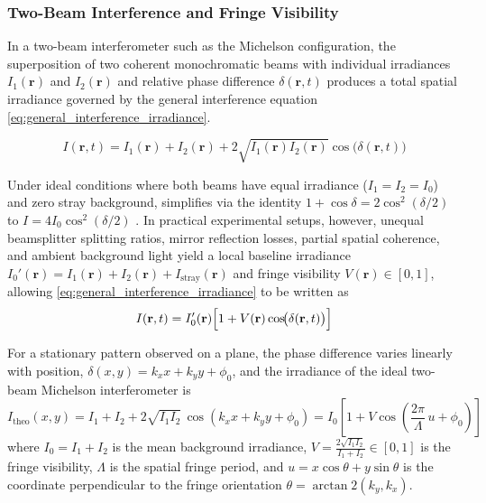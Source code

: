 \subsubsection{Two-Beam Interference and Fringe Visibility}
\label{sec:two_beam_interference}

In a two-beam interferometer such as the Michelson configuration, the superposition of two coherent monochromatic beams with individual irradiances $I_1(\mathbf{r})$ and $I_2(\mathbf{r})$ and relative phase difference $\delta(\mathbf{r}, t)$ produces a total spatial irradiance governed by the general interference equation \cref{eq:general_interference_irradiance}.


\begin{equation}
    I(\mathbf{r}, t) = I_1(\mathbf{r}) + I_2(\mathbf{r}) + 2\sqrt{I_1(\mathbf{r}) I_2(\mathbf{r})}\cos\!\bigl(\delta(\mathbf{r}, t)\bigr)
    \label{eq:general_interference_irradiance}
\end{equation}


Under ideal conditions where both beams have equal irradiance ($I_1 = I_2 = I_0$) and zero stray background, simplifies via the identity $1 + \cos\delta = 2\cos^2(\delta/2)$ to $I = 4I_0\cos^2(\delta/2)$ \cite{pedrottiIntroductionOptics2007, hechtOptics2017}. In practical experimental setups, however, unequal beamsplitter splitting ratios, mirror reflection losses, partial spatial coherence, and ambient background light yield a local baseline irradiance $I_0'(\mathbf{r}) = I_1(\mathbf{r}) + I_2(\mathbf{r}) + I_{\text{stray}}(\mathbf{r})$ and fringe visibility $V(\mathbf{r}) \in [0, 1]$, allowing \cref{eq:general_interference_irradiance} to be written as
\begin{equation}
    I(\mathbf{r}, t) = I_0'(\mathbf{r})\Bigl[1 + V(\mathbf{r})\cos\!\bigl(\delta(\mathbf{r}, t)\bigr)\Bigr]
    \label{eq:visibility_irradiance}
\end{equation}

For a stationary pattern observed on a plane, the phase difference varies linearly with position, $\delta(x, y) = k_x x + k_y y + \phi_0$, and the irradiance of the ideal two-beam Michelson interferometer is
\begin{equation}
    I_{\text{theo}}(x, y) = I_1 + I_2 + 2\sqrt{I_1 I_2}\,\cos(k_x x + k_y y + \phi_0)
    = I_0\left[1 + V\cos\!\left(\frac{2\pi}{\Lambda}\,u + \phi_0\right)\right]
    \label{eq:michelson_spatial}
\end{equation}
where $I_0 = I_1 + I_2$ is the mean background irradiance, $V = \frac{2\sqrt{I_1 I_2}}{I_1 + I_2} \in [0, 1]$ is the fringe visibility, $\Lambda$ is the spatial fringe period, and $u = x\cos\theta + y\sin\theta$ is the coordinate perpendicular to the fringe orientation $\theta = \arctan2(k_y, k_x)$.
